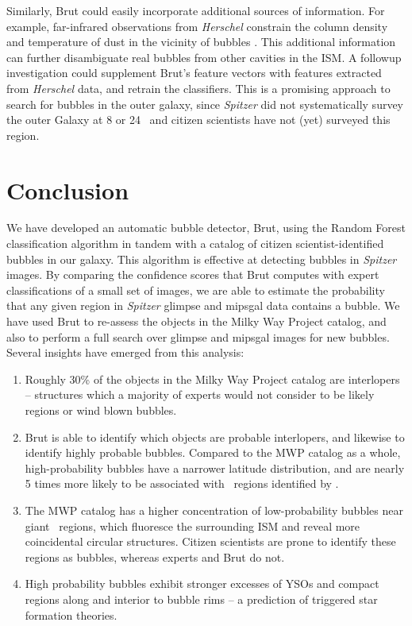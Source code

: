 Similarly, Brut could easily incorporate additional sources of information. For example, far-infrared observations from \emph{Herschel} constrain the column density and temperature of dust in the vicinity of bubbles \citep{Anderson12}. This additional information can further disambiguate real bubbles from other cavities in the ISM. A followup investigation could supplement Brut's feature vectors with features extracted from \emph{Herschel} data, and retrain the classifiers. This is a promising approach to search for bubbles in the outer galaxy, since \emph{Spitzer} did not systematically survey the outer Galaxy at 8 or 24 \um\, and citizen scientists have not (yet) surveyed this region.


\section{Conclusion}
\label{sec:conclusion}
We have developed an automatic bubble detector, Brut, using the Random Forest classification algorithm in tandem with a catalog of citizen scientist-identified bubbles in our galaxy. This algorithm is effective at detecting bubbles in \emph{Spitzer} images. By comparing the confidence scores that Brut computes with expert classifications of a small set of images, we are able to estimate the probability that any given region in \emph{Spitzer} {\sc glimpse} and {\sc mipsgal} data contains a bubble. We have used Brut to re-assess the objects in the Milky Way Project catalog, and also to perform a full search over {\sc glimpse} and {\sc mipsgal} images for new bubbles.  Several insights have emerged from this analysis:
\begin{enumerate}
\item Roughly 30\% of the objects in the Milky Way Project catalog are interlopers -- structures which a majority of experts would not consider to be likely \hii\, regions or wind blown bubbles.
\item Brut is able to identify which objects are probable interlopers, and likewise to identify highly probable bubbles. Compared to the MWP catalog as a whole, high-probability bubbles have a narrower latitude distribution, and are nearly 5 times more likely to be associated with \hii\, regions identified by \cite{Anderson11}.
\item The MWP catalog has a higher concentration of low-probability bubbles near giant \hii\, regions, which fluoresce the surrounding ISM and reveal more coincidental circular structures. Citizen scientists are prone to identify these regions as bubbles, whereas experts and Brut do not.
\item High probability bubbles  exhibit stronger excesses of YSOs and compact \hii\, regions along and interior to bubble rims -- a prediction of triggered star formation theories.
\end{enumerate}

